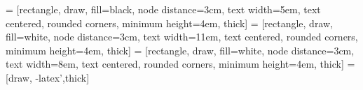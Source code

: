 \documentclass{beamer}
\begin{document}
 = [rectangle, draw, fill=black, node distance=3cm, text width=5em, text centered, rounded corners, minimum height=4em, thick]
 = [rectangle, draw, fill=white, node distance=3cm, text width=11em, text centered, rounded corners, minimum height=4em, thick]
 = [rectangle, draw, fill=white, node distance=3cm, text width=8em, text centered, rounded corners, minimum height=4em, thick]
 = [draw, -latex',thick]
\end{document}
